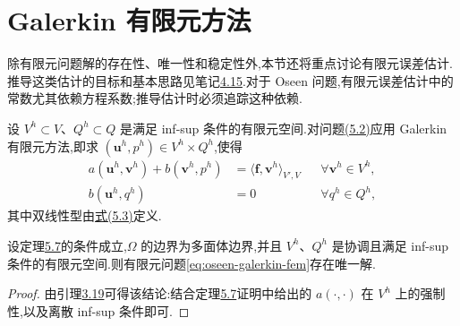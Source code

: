 \section{Galerkin 有限元方法}\label{sec:oseen-galerkin-fem}

\begin{note}[目标]\label{note:oseen-fem-goals}
除有限元问题解的存在性、唯一性和稳定性外,本节还将重点讨论有限元误差估计.推导这类估计的目标和基本思路见笔记\hyperref[note:stokes-error-analysis-goal]{4.15}.对于 Oseen 问题,有限元误差估计中的常数尤其依赖方程系数;推导估计时必须追踪这种依赖.
\end{note}

\begin{note}\label{note:oseen-fem-conforming-infsup}
设 $V^h\subset V$、$Q^h\subset Q$ 是满足 inf-sup 条件的有限元空间.对问题\hyperref[eq:oseen-weak]{(5.2)}应用 Galerkin 有限元方法,即求 $(\bm{u}^h,p^h)\in V^h\times Q^h$,使得
\begin{equation}\label{eq:oseen-galerkin-fem}
\begin{aligned}
  a(\bm{u}^h,\bm{v}^h)+b(\bm{v}^h,p^h)
    &=\langle\bm{f},\bm{v}^h\rangle_{V',V}
      &&\forall\bm{v}^h\in V^h,\\
  b(\bm{u}^h,q^h)&=0
      &&\forall q^h\in Q^h,
\end{aligned}
\end{equation}
其中双线性型由\hyperref[eq:oseen-bilinear-forms]{式(5.3)}定义.
\end{note}

\begin{corollary}[有限元问题的唯一可解性]\label{cor:oseen-fem-unique-solvability}
设定理\hyperref[thm:oseen-weak-existence-uniqueness]{5.7}的条件成立,$\Omega$ 的边界为多面体边界,并且 $V^h$、$Q^h$ 是协调且满足 inf-sup 条件的有限元空间.则有限元问题\cref{eq:oseen-galerkin-fem}存在唯一解.
\end{corollary}
\begin{proof}
由引理\hyperref[lem:sufficient-condition-ellipticity]{3.19}可得该结论:结合定理\hyperref[thm:oseen-weak-existence-uniqueness]{5.7}证明中给出的 $a(\cdot,\cdot)$ 在 $V^h$ 上的强制性,以及离散 inf-sup 条件即可.
\end{proof}

